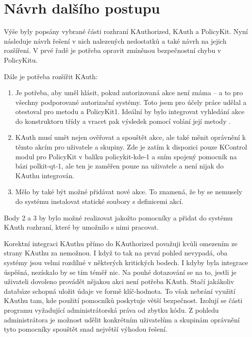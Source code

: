 \section{Návrh dalšího postupu}
Výše byly popsány vybrané části rozhraní KAuthorized, KAuth a PolicyKit. Nyní následuje návrh řešení v nich nalezených nedostatků a také návrh na jejich rozšíření. V prvé řadě je potřeba opravit zmíněnou bezpečnostní chybu v PolicyKitu.

Dále je potřeba rozšířit KAuth:
\begin{enumerate}
\item Je potřeba, aby uměl hlásit, pokud autorizovaná akce není známa -- a to pro všechny podporované autorizační systémy. Toto jsem pro účely práce udělal a otestoval pro metodu  a PolicyKit1. Ideální by bylo integrovat vyhledání akce do konstruktoru třídy  a vracet pak výsledek pomocí volání její metody .
\item KAuth musí umět nejen ověřovat a spouštět akce, ale také měnit oprávnění k těmto akcím pro uživatele a skupiny. Zde je zatím k dispozici pouze KControl modul pro PolicyKit v balíku policykit-kde-1 a sním spojený pomocník na bázi polkit-qt-1, ale ten je zaměřen pouze na uživatele a není nijak do KAuthu integrován.
\item Mělo by také být možné přidávat nové akce. To znamená, že by se nemusely do systému instalovat statické soubory s definicemi akcí.
\end{enumerate}

Body 2 a 3 by bylo možné realizovat jakožto pomocníky a přidat do systému KAuth rozhraní, které by umožnilo s nimi pracovat.

Korektní integraci KAuthu přímo do KAuthorized považuji kvůli omezením ze strany KAuthu za nemožnou. I když to tak na první pohled nevypadá, oba systémy jsou velmi rozdílné v některých kritických bodech. I kdyby byla integrace úspěšná, nezískalo by se tím téměř nic. Na pouhé dotazování se na to, jestli je uživateli dovoleno provádět nějakou akci není potřeba KAuth. Stačí jakákoliv databáze schopná uložit údaje ve formě klíč-hodnota. To však nebrání využití KAuthu tam, kde použití pomocníků poskytuje větší bezpečnost. Izolují se části programu vyžadující administrátorská práva od zbytku kódu. Z pohledu administrátora je možnost udělit konkrétním uživatelům a skupinám oprávnění tyto pomocníky spouštět snad největší výhodou řešení.

